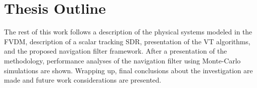 \section{\textbf{Thesis Outline}}
The rest of this work follows a description of the physical systems modeled in the FVDM, description of a scalar tracking SDR, presentation of the VT algorithms, and the proposed navigation filter framework. After a presentation of the methodology, performance analyses of the navigation filter using Monte-Carlo simulations are shown. Wrapping up, final conclusions about the investigation are made and future work considerations are presented.